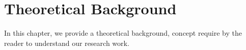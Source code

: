  
\chapter{Theoretical Background}
In this chapter, we  provide a theoretical background, concept require by the reader to understand our research work.
\par\vspace{1em}







